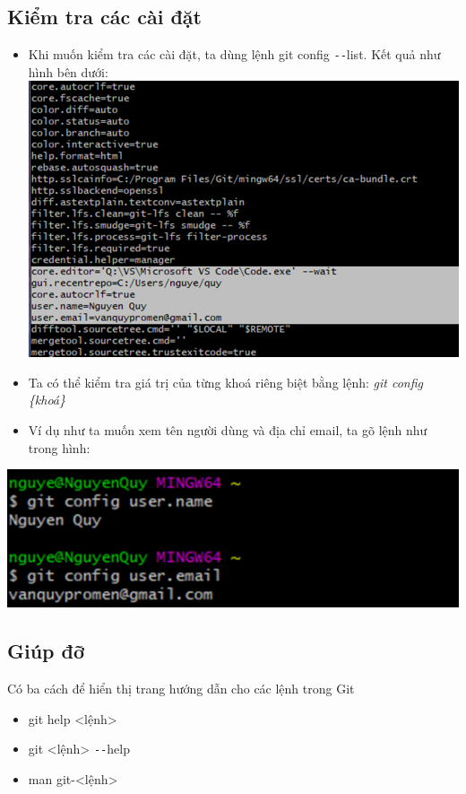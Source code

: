 \documentclass[12pt,a4paper]{report}
\begin{document}
\subsection{Kiểm tra các cài đặt}
\begin{itemize}
\item Khi muốn kiểm tra các cài đặt, ta dùng lệnh git config \texttt{-{}-}list. Kết quả như hình bên dưới: 
\vskip 0.4cm
	\includegraphics[width=0.8\linewidth]{screenshot003}
	\label{fig:screenshot003}\vskip 0.4cm\vskip 0.4cm

\item Ta có thể kiểm tra giá trị của từng khoá riêng biệt bằng lệnh: {\it git config \{khoá\}}
\item Ví dụ như ta muốn xem tên người dùng và địa chỉ email, ta gõ lệnh như trong hình: 
\end{itemize}
\vskip 0.4cm

	\includegraphics[width=0.8\linewidth]{screenshot004}
	\label{fig:screenshot004}
 \vskip 0.4cm\vskip 0.4cm
\subsection{Giúp đỡ} 
 Có ba cách để hiển thị trang hướng dẫn cho các lệnh trong Git
\begin{itemize}
\item git help <lệnh>
\item git <lệnh> \texttt{-{}-}help
\item man git-<lệnh> 
\end{itemize}
 
\end{document}
